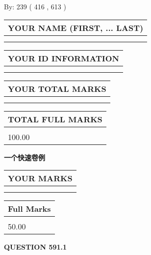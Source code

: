 \documentclass{ctexart}
\begin{document}
   
\hspace{1.0in} By: 
 239 ( 416 ,  613 )
   
   
   
   
\newpage 
\setcounter{page}{ 
   591001 } 
   
   
   
   
\noindent\begin{tabular}{|l|}
\hline
YOUR NAME (FIRST, ... LAST)  \\
\hline
 \\ 
 \\ 
\hline
\end{tabular}
\hspace{0.05in} \begin{tabular}{|l|}
\hline
 YOUR   ID   INFORMATION  \\
\hline
 \\ 
 \\ 
\hline
\end{tabular}
   
   
\vspace{0.2in}\noindent\begin{tabular}{|l|}
\hline
YOUR TOTAL MARKS  \\
\hline
 \\ 
 \\ 
\hline
\end{tabular}
\hspace{0.05in} \begin{tabular}{|l|}
\hline
TOTAL FULL MARKS  \\
\hline
 \\ 
100.00 \\
\hline
\end{tabular}
   
   
 \vspace{0.2in}
{\LARGE {\textbf{ 一个快速卷例}}}
   
   
  
\vspace{0.2in}
  
\noindent\begin{tabular}{|l|}
\hline
 YOUR MARKS  \\
\hline
 \\ 
 \\ 
\hline
\end{tabular}
\hspace{0.05in} \begin{tabular}{|l|}
\hline
 Full Marks  \\
\hline
 \\ 
50.00 \\
\hline
\end{tabular}
{\textbf{\Large{QUESTION
591.1 
}}}
  
\end{document}
